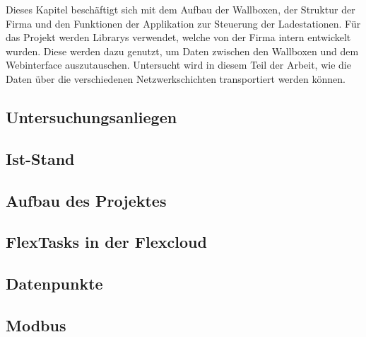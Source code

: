 Dieses Kapitel beschäftigt sich mit dem Aufbau der Wallboxen, der Struktur der Firma und den Funktionen der Applikation zur Steuerung der Ladestationen. Für das Projekt werden Librarys verwendet, welche von der Firma intern entwickelt wurden. Diese werden dazu genutzt, um Daten zwischen den Wallboxen und dem Webinterface auszutauschen. Untersucht wird in diesem Teil der Arbeit, wie die Daten über die verschiedenen Netzwerkschichten transportiert werden können. 


\begin{spacing}{1}
    \section{Untersuchungsanliegen}\label{section:untersuchungsanliegen}
    \end{spacing}


\begin{spacing}{1}
    \section{Ist-Stand}\label{section:ist-standWallbox}
    \end{spacing}



\begin{spacing}{1}
    \section{Aufbau des Projektes}\label{section:aufbaudesProjektesWallbox}
    \end{spacing}


\begin{spacing}{1}
    \section{FlexTasks in der Flexcloud}\label{section:FlexTasks}
    \end{spacing}


\begin{spacing}{1}
    \section{Datenpunkte}\label{section:datapoints}
    \end{spacing}


\begin{spacing}{1}
    \section{Modbus}\label{section:modbus}
    \end{spacing}

